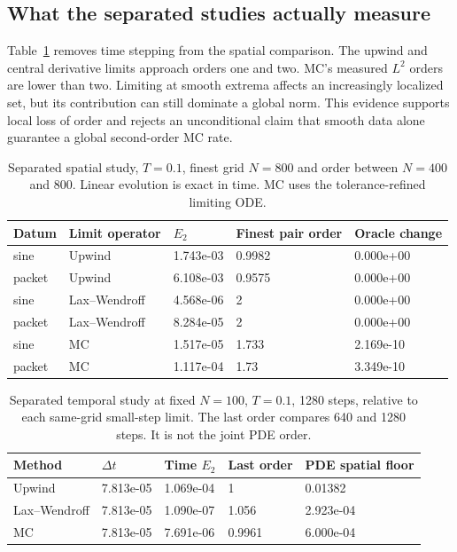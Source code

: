 \subsection{What the separated studies actually measure}
Table~\ref{tab:space} removes time stepping from the spatial comparison. The upwind and central derivative limits approach orders one and two. MC's measured $L^2$ orders are lower than two. Limiting at smooth extrema affects an increasingly localized set, but its contribution can still dominate a global norm. This evidence supports local loss of order and rejects an unconditional claim that smooth data alone guarantee a global second-order MC rate.
\begin{table}[htbp]\centering\small
\caption{Separated spatial study, $T=0.1$, finest grid $N=800$ and order between $N=400$ and 800. Linear evolution is exact in time. MC uses the tolerance-refined limiting ODE.}\label{tab:space}
\begin{tabular}{lllll}
\toprule
Datum & Limit operator & $E_2$ & Finest pair order & Oracle change\\\midrule
sine & Upwind & 1.743e-03 & 0.9982 & 0.000e+00\\
packet & Upwind & 6.108e-03 & 0.9575 & 0.000e+00\\
sine & Lax--Wendroff & 4.568e-06 & 2 & 0.000e+00\\
packet & Lax--Wendroff & 8.284e-05 & 2 & 0.000e+00\\
sine & MC & 1.517e-05 & 1.733 & 2.169e-10\\
packet & MC & 1.117e-04 & 1.73 & 3.349e-10\\
\bottomrule\end{tabular}\end{table}
\begin{table}[htbp]\centering\small
\caption{Separated temporal study at fixed $N=100$, $T=0.1$, 1280 steps, relative to each same-grid small-step limit. The last order compares 640 and 1280 steps. It is not the joint PDE order.}\label{tab:time}
\begin{tabular}{lllll}
\toprule
Method & $\Delta t$ & Time $E_2$ & Last order & PDE spatial floor\\\midrule
Upwind & 7.813e-05 & 1.069e-04 & 1 & 0.01382\\
Lax--Wendroff & 7.813e-05 & 1.090e-07 & 1.056 & 2.923e-04\\
MC & 7.813e-05 & 7.691e-06 & 0.9961 & 6.000e-04\\
\bottomrule\end{tabular}\end{table}
